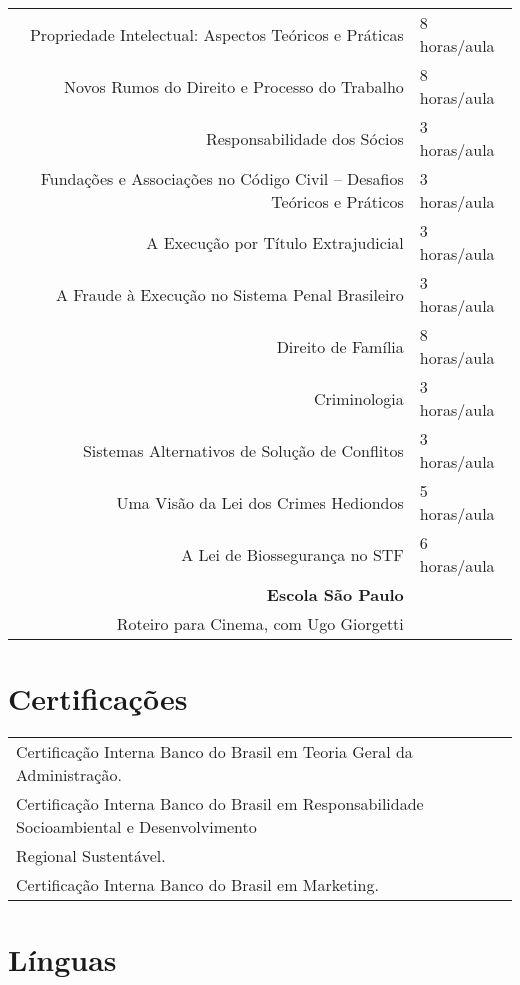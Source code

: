 \documentclass[a4paper,10pt]{article} %
\begin{document}
\begin{tabular}{r|l}
Propriedade Intelectual: Aspectos Teóricos e Práticas & 8 horas/aula\\
Novos Rumos do Direito e Processo do Trabalho & 8 horas/aula\\
Responsabilidade dos Sócios & 3 horas/aula\\
Fundações e Associações no Código Civil – Desafios Teóricos e Práticos & 3 horas/aula\\
A Execução por Título Extrajudicial & 3 horas/aula\\
A Fraude à Execução no Sistema Penal Brasileiro & 3 horas/aula\\
Direito de Família & 8 horas/aula\\
Criminologia & 3 horas/aula\\
Sistemas Alternativos de Solução de Conflitos & 3 horas/aula\\
Uma Visão da Lei dos Crimes Hediondos & 5 horas/aula\\
A Lei de Biossegurança no STF & 6 horas/aula\\
\textbf{Escola São Paulo} & \\
Roteiro para Cinema, com Ugo Giorgetti &\\

\end{tabular}


\section{Certificações}

\begin{tabular}{l}
Certificação Interna Banco do Brasil em Teoria Geral da Administração.\\
Certificação Interna Banco do Brasil em Responsabilidade Socioambiental e Desenvolvimento \\\hspace{4cm}Regional Sustentável.\\
Certificação Interna Banco do Brasil em Marketing.\\
\end{tabular}


\section{Línguas}
\end{document}

